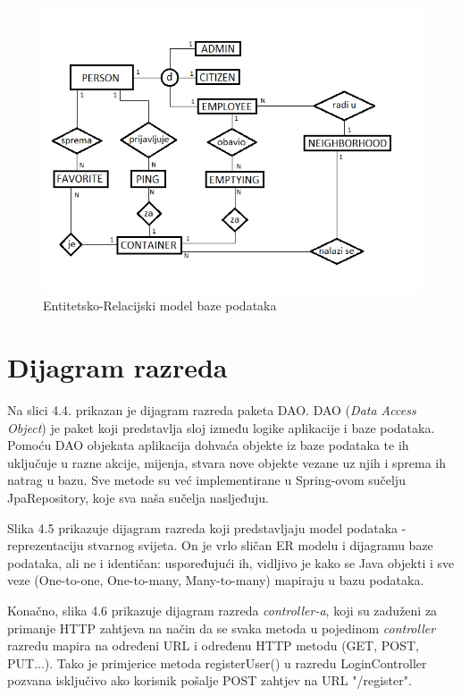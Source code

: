 				\begin{figure}[H]
					\includegraphics[scale=0.8]{figures/er_model.PNG}
					\centering
					\caption{Entitetsko-Relacijski model baze podataka}
					\label{fig:er-model}
				\end{figure}
			
			\eject
			
			
		\section{Dijagram razreda}
		
			Na slici 4.4. prikazan je dijagram razreda paketa DAO. DAO (\textit{Data Access Object}) je paket koji predstavlja sloj između logike aplikacije i baze podataka. Pomoću DAO objekata aplikacija dohvaća objekte iz baze podataka te ih uključuje u razne akcije, mijenja, stvara nove objekte vezane uz njih i sprema ih natrag u bazu. Sve metode su već implementirane u Spring-ovom sučelju JpaRepository, koje sva naša sučelja nasljeđuju.
			
			Slika 4.5 prikazuje dijagram razreda koji predstavljaju model podataka - reprezentaciju stvarnog svijeta. On je vrlo sličan ER modelu i dijagramu baze podataka, ali ne i identičan: uspoređujući ih, vidljivo je kako se Java objekti i sve veze (One-to-one, One-to-many, Many-to-many) mapiraju u bazu podataka.
			
			Konačno, slika 4.6 prikazuje dijagram razreda \textit{controller-a}, koji su zaduženi za primanje HTTP zahtjeva na način da se svaka metoda u pojedinom \textit{controller} razredu mapira na određeni URL i određenu HTTP metodu (GET, POST, PUT...). Tako je primjerice metoda registerUser() u razredu LoginController pozvana isključivo ako korisnik pošalje POST zahtjev na URL "/register".
			
